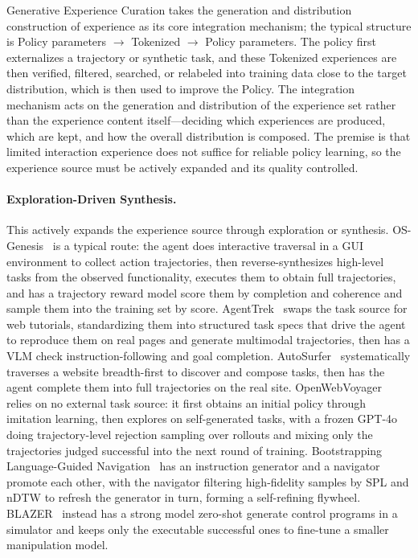 Generative Experience Curation takes the generation and distribution construction of experience as its core integration mechanism; the typical structure is Policy parameters $\rightarrow$ Tokenized $\rightarrow$ Policy parameters. The policy first externalizes a trajectory or synthetic task, and these Tokenized experiences are then verified, filtered, searched, or relabeled into training data close to the target distribution, which is then used to improve the Policy. The integration mechanism acts on the generation and distribution of the experience set rather than the experience content itself---deciding which experiences are produced, which are kept, and how the overall distribution is composed. The premise is that limited interaction experience does not suffice for reliable policy learning, so the experience source must be actively expanded and its quality controlled.

\paragraph{Exploration-Driven Synthesis.} This actively expands the experience source through exploration or synthesis. OS-Genesis~\cite{Sun24b} is a typical route: the agent does interactive traversal in a GUI environment to collect action trajectories, then reverse-synthesizes high-level tasks from the observed functionality, executes them to obtain full trajectories, and has a trajectory reward model score them by completion and coherence and sample them into the training set by score. AgentTrek~\cite{Xu24} swaps the task source for web tutorials, standardizing them into structured task specs that drive the agent to reproduce them on real pages and generate multimodal trajectories, then has a VLM check instruction-following and goal completion. AutoSurfer~\cite{Fai26} systematically traverses a website breadth-first to discover and compose tasks, then has the agent complete them into full trajectories on the real site. OpenWebVoyager~\cite{He24e} relies on no external task source: it first obtains an initial policy through imitation learning, then explores on self-generated tasks, with a frozen GPT-4o doing trajectory-level rejection sampling over rollouts and mixing only the trajectories judged successful into the next round of training. Bootstrapping Language-Guided Navigation~\cite{Wan24ad} has an instruction generator and a navigator promote each other, with the navigator filtering high-fidelity samples by SPL and nDTW to refresh the generator in turn, forming a self-refining flywheel. BLAZER~\cite{Das25} instead has a strong model zero-shot generate control programs in a simulator and keeps only the executable successful ones to fine-tune a smaller manipulation model.

